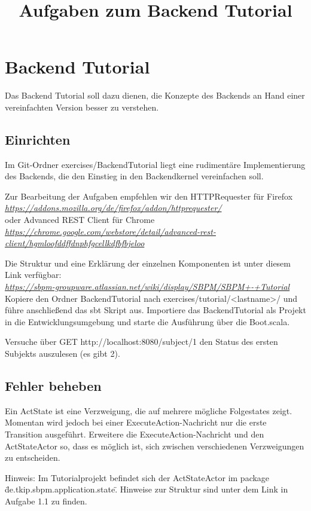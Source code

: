 \documentclass[11pt]{tudexercise}
\title{Aufgaben zum Backend Tutorial}
\newcommand{\link}[1]{\\ \textcolor{blue}{\textit{\url{#1}}}}
\begin{document}
  \maketitle

\section{Backend Tutorial}
  Das Backend Tutorial soll dazu dienen, die Konzepte des Backends an Hand einer vereinfachten
  Version besser zu verstehen.

  \subsection{Einrichten}
    Im Git-Ordner exercises/BackendTutorial liegt eine rudimentäre Implementierung des Backends,
    die den Einstieg in den Backendkernel vereinfachen soll.

    Zur Bearbeitung der Aufgaben empfehlen wir den HTTPRequester für Firefox
    \link{https://addons.mozilla.org/de/firefox/addon/httprequester/}\\
    oder Advanced REST Client für Chrome
    \link{https://chrome.google.com/webstore/detail/advanced-rest-client/hgmloofddffdnphfgcellkdfbfbjeloo}

    Die Struktur und eine Erklärung der einzelnen Komponenten ist unter diesem Link verfügbar:
    \link{https://sbpm-groupware.atlassian.net/wiki/display/SBPM/SBPM+-+Tutorial}\\
    Kopiere den Ordner BackendTutorial nach exercises/tutorial/<lastname>/ und führe anschließend das sbt Skript aus.
    Importiere das BackendTutorial als Projekt in die Entwicklungsumgebung und starte die Ausführung
    über die Boot.scala.

    Versuche über GET http://localhost:8080/subject/1 den Status des ersten Subjekts auszulesen (es gibt 2).

  \subsection{Fehler beheben}
    Ein ActState ist eine Verzweigung, die auf mehrere mögliche Folgestates zeigt. Momentan wird jedoch bei
    einer ExecuteAction-Nachricht nur die erste Transition ausgeführt. Erweitere die ExecuteAction-Nachricht
    und den ActStateActor so, dass es möglich ist, sich zwischen verschiedenen Verzweigungen zu entscheiden.

Hinweis: Im Tutorialprojekt befindet sich der ActStateActor im package \"de.tkip.sbpm.application.state\". Hinweise zur Struktur sind unter dem Link in Aufgabe 1.1 zu finden.
\end{document}
